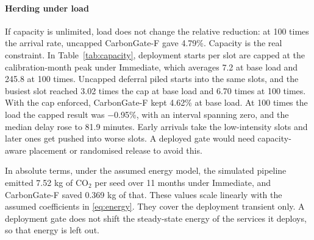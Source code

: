 \documentclass[journal]{IEEEtran}
\begin{document}
\paragraph{Herding under load} If capacity is unlimited, load does not change the relative reduction: at 100 times the arrival rate, uncapped CarbonGate-F gave 4.79\%. Capacity is the real constraint. In Table~\ref{tab:capacity}, deployment starts per slot are capped at the calibration-month peak under Immediate, which averages 7.2 at base load and 245.8 at 100 times. Uncapped deferral piled starts into the same slots, and the busiest slot reached 3.02 times the cap at base load and 6.70 times at 100 times. With the cap enforced, CarbonGate-F kept 4.62\% at base load. At 100 times the load the capped result was $-$0.95\%, with an interval spanning zero, and the median delay rose to 81.9 minutes. Early arrivals take the low-intensity slots and later ones get pushed into worse slots. A deployed gate would need capacity-aware placement or randomised release to avoid this.

\begin{table}[!t]
\caption{Load scaling with a per-slot start cap at $D = 4$ h. Peak is the number of starts in the busiest slot over the cap. $R$ is in \% with 95\% CI, and delays are in minutes.}
\label{tab:capacity}
\centering
{}
\end{table}

In absolute terms, under the assumed energy model, the simulated pipeline emitted 7.52 kg of CO$_2$ per seed over 11 months under Immediate, and CarbonGate-F saved 0.369 kg of that. These values scale linearly with the assumed coefficients in \eqref{eq:energy}. They cover the deployment transient only. A deployment gate does not shift the steady-state energy of the services it deploys, so that energy is left out.
\end{document}

